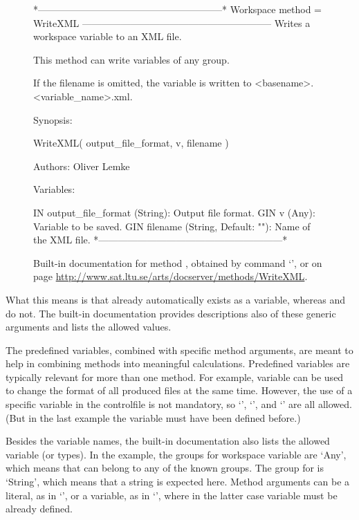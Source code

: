 \begin{figure}
\footnotesize
\begin{code}
*---------------------------------------------------------*
Workspace method = WriteXML
-----------------------------------------------------------
Writes a workspace variable to an XML file.

This method can write variables of any group.

If the filename is omitted, the variable is written
to <basename>.<variable_name>.xml.

Synopsis:

WriteXML( output_file_format, v, filename )

Authors: Oliver Lemke

Variables:

IN    output_file_format (String): Output file format.
GIN   v (Any): Variable to be saved.
GIN   filename (String, Default: ""): Name of the XML file.
*---------------------------------------------------------*
\end{code}
\caption{Built-in documentation for method , obtained by
  command `', or on page
  \url{http://www.sat.ltu.se/arts/docserver/methods/WriteXML}.}
\label{fig:WriteXML}
\end{figure}

What this means is that  already automatically
exists as a variable, whereas  and 
do not. The built-in documentation provides descriptions also of these generic
arguments and lists the allowed values.

The predefined variables, combined with specific method arguments, are meant to
help in combining methods into meaningful calculations. Predefined variables
are typically relevant for more than one method. For example, variable
 can be used to change the format of all produced
files at the same time. However, the use of a specific variable in the
controlfile is not mandatory, so `', `', and
`' are all allowed. (But in the
last example the variable  must have been defined before.)

Besides the variable names, the built-in documentation also lists the allowed
variable  (or types). In the example, the groups for workspace variable
 are `Any', which means that  can belong to any of the
known groups. The group for  is `String', which means that a
string is expected here. Method arguments can be a literal, as in
`', or a variable, as in
`', where in the latter case variable
 must be already defined.

